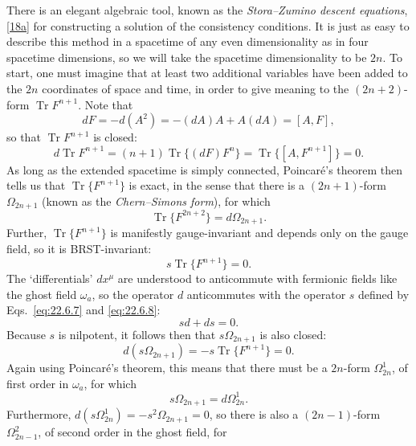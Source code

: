 There is an elegant algebraic tool, known as the
\emph{Stora--Zumino descent equations},\hyperref[ch22-ref-18a]{[18a]} for
constructing a solution of the consistency conditions. It is just as easy
to describe this method in a spacetime of any even dimensionality as in
four spacetime dimensions, so we will take the spacetime dimensionality to
be $2n$. To start, one must imagine that at least two additional variables
have been added to the $2n$ coordinates of space and time, in order to give
meaning to the $(2n+2)$-form $\operatorname{Tr}F^{n+1}$. Note that
\begin{equation}
 dF=-d(A^2)=-(dA)A+A(dA)=[A,F],
 \tag{22.6.22}\label{eq:22.6.22}
\end{equation}
so that $\operatorname{Tr}F^{n+1}$ is closed:
\begin{equation}
 d\operatorname{Tr}F^{n+1}
 =(n+1)\operatorname{Tr}\{(dF)F^n\}
 =\operatorname{Tr}\{[A,F^{n+1}]\}=0.
 \tag{22.6.23}\label{eq:22.6.23}
\end{equation}
As long as the extended spacetime is simply connected, Poincaré's theorem
then tells us that $\operatorname{Tr}\{F^{n+1}\}$ is exact, in the sense
that there is a $(2n+1)$-form $\Omega_{2n+1}$ (known as the
\emph{Chern--Simons form}), for which
\begin{equation}
 \operatorname{Tr}\{F^{2n+2}\}=d\Omega_{2n+1}.
 \tag{22.6.24}\label{eq:22.6.24}
\end{equation}
Further, $\operatorname{Tr}\{F^{n+1}\}$ is manifestly gauge-invariant and
depends only on the gauge field, so it is BRST-invariant:
\begin{equation}
 s\operatorname{Tr}\{F^{n+1}\}=0.
 \tag{22.6.25}\label{eq:22.6.25}
\end{equation}
The `differentials' $dx^\mu$ are understood to anticommute with fermionic
fields like the ghost field $\omega_a$, so the operator $d$
anticommutes with the operator $s$ defined by Eqs.~\eqref{eq:22.6.7} and
\eqref{eq:22.6.8}:
\[
 sd+ds=0.
\]
Because $s$ is nilpotent, it follows then that $s\Omega_{2n+1}$ is also
closed:
\[
 d(s\Omega_{2n+1})=-s\operatorname{Tr}\{F^{n+1}\}=0.
\]
Again using Poincaré's theorem, this means that there must be a $2n$-form
$\Omega^1_{2n}$, of first order in $\omega_a$, for which
\begin{equation}
 s\Omega_{2n+1}=d\Omega^1_{2n}.
 \tag{22.6.26}\label{eq:22.6.26}
\end{equation}
Furthermore, $d(s\Omega^1_{2n})=-s^2\Omega_{2n+1}=0$, so there is also a
$(2n-1)$-form $\Omega^2_{2n-1}$, of second order in the ghost field, for
